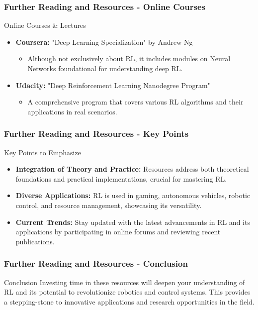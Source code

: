 \documentclass[aspectratio=169]{beamer}
\begin{document}
\begin{frame}[fragile]
  \frametitle{Further Reading and Resources - Online Courses}
  \begin{block}{Online Courses \& Lectures}
    \begin{itemize}
      \item \textbf{Coursera:} "Deep Learning Specialization" by Andrew Ng
          \begin{itemize}
              \item Although not exclusively about RL, it includes modules on Neural Networks foundational for understanding deep RL.
          \end{itemize}

      \item \textbf{Udacity:} "Deep Reinforcement Learning Nanodegree Program"
          \begin{itemize}
              \item A comprehensive program that covers various RL algorithms and their applications in real scenarios.
          \end{itemize}
    \end{itemize}
  \end{block}
\end{frame}

\begin{frame}[fragile]
  \frametitle{Further Reading and Resources - Key Points}
  \begin{block}{Key Points to Emphasize}
      \begin{itemize}
          \item \textbf{Integration of Theory and Practice:} Resources address both theoretical foundations and practical implementations, crucial for mastering RL.
          \item \textbf{Diverse Applications:} RL is used in gaming, autonomous vehicles, robotic control, and resource management, showcasing its versatility.
          \item \textbf{Current Trends:} Stay updated with the latest advancements in RL and its applications by participating in online forums and reviewing recent publications.
      \end{itemize}
  \end{block}
\end{frame}

\begin{frame}[fragile]
  \frametitle{Further Reading and Resources - Conclusion}
  \begin{block}{Conclusion}
      Investing time in these resources will deepen your understanding of RL and its potential to revolutionize robotics and control systems.
      This provides a stepping-stone to innovative applications and research opportunities in the field.
  \end{block}
\end{frame}
\end{document}
